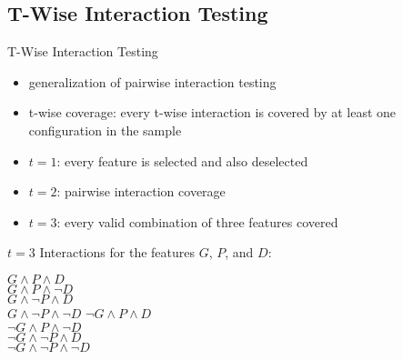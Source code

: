 \subsection{T-Wise Interaction Testing}
\begin{frame}{\myframetitle{}}
	\begin{fancycolumns}[widths={60,38}]
		\begin{definition}{T-Wise Interaction Testing}
			\begin{itemize}
				\setlength\itemsep{.5em}
				\item generalization of pairwise interaction testing
				\item t-wise coverage: every t-wise interaction is covered by at least one configuration in the sample
				\item $t=1$: every feature is selected and also deselected
				\item $t=2$: pairwise interaction coverage
				\item $t=3$: every valid combination of three features covered
			\end{itemize}
		\end{definition}
	\nextcolumn
		\begin{example}{{$t=3$ Interactions}}
			for the features $G$, $P$, and $D$:

			\begin{fancycolumns}[animation=none]
				$G \wedge P \wedge D$\\
				$G \wedge P \wedge \neg D$\\
				$G \wedge \neg P \wedge D$\\
				$G \wedge \neg P \wedge \neg D$
			\nextcolumn
				$\neg G \wedge P \wedge D$\\
				$\neg G \wedge P \wedge \neg D$\\
				$\neg G \wedge \neg P \wedge D$\\
				$\neg G \wedge \neg P \wedge \neg D$
			\end{fancycolumns}
		\end{example}
	\end{fancycolumns}
\end{frame}


